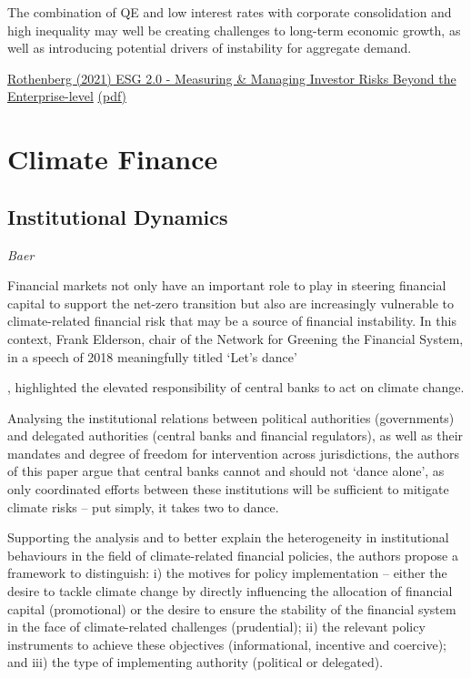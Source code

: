 \documentclass[
]{book}
\begin{document}
The combination of QE and low interest rates with corporate consolidation and high
inequality may well be creating challenges to long-term economic growth,
as well as introducing
potential drivers of instability for aggregate demand.

\href{https://papers.ssrn.com/sol3/papers.cfm?abstract_id=3820316}{Rothenberg (2021) ESG 2.0 - Measuring \& Managing Investor Risks Beyond the Enterprise-level}
\href{Rothenberg_2021_ESG2.pdf}{(pdf)}

\hypertarget{climate-finance}{%
\chapter{Climate Finance}\label{climate-finance}}

\hypertarget{institutional-dynamics}{%
\section{Institutional Dynamics}\label{institutional-dynamics}}

\emph{Baer}

Financial markets not only have an important role to play in steering financial capital to support the net-zero transition but also are increasingly vulnerable to climate-related financial risk that may be a source of financial instability. In this context, Frank Elderson, chair of the Network for Greening the Financial System, in a speech of 2018 meaningfully titled `Let's dance'﻿

, highlighted the elevated responsibility of central banks to act on climate change.

Analysing the institutional relations between political authorities (governments) and delegated authorities (central banks and financial regulators), as well as their mandates and degree of freedom for intervention across jurisdictions, the authors of this paper argue that central banks cannot and should not `dance alone', as only coordinated efforts between these institutions will be sufficient to mitigate climate risks -- put simply, it takes two to dance.

Supporting the analysis and to better explain the heterogeneity in institutional behaviours in the field of climate-related financial policies, the authors propose a framework to distinguish: i) the motives for policy implementation -- either the desire to tackle climate change by directly influencing the allocation of financial capital (promotional) or the desire to ensure the stability of the financial system in the face of climate-related challenges (prudential); ii) the relevant policy instruments to achieve these objectives (informational, incentive and coercive); and iii) the type of implementing authority (political or delegated).
\end{document}
